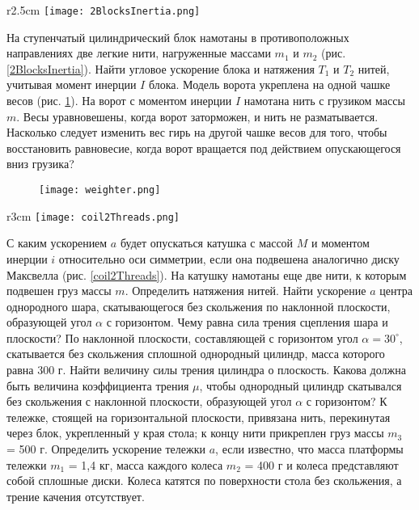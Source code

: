 \begin{wrapfigure}[13]{r}{2.5cm}
\texttt{[image: 2BlocksInertia.png]}
\caption{}
\label{2BlocksInertia}
\end{wrapfigure}
\AddProb На ступенчатый цилиндрический блок намотаны в противоположных направлениях две легкие нити, нагруженные массами $m_1$ и $m_2$ (рис. \ref{2BlocksInertia}). Найти угловое ускорение блока и натяжения $T_1$ и $T_2$ нитей, учитывая момент инерции $I$ блока.
\AddProb Модель ворота укреплена на одной чашке весов (рис. \ref{weighter}). На ворот с моментом инерции $I$ намотана нить с грузиком массы $m$. Весы уравновешены, когда ворот заторможен, и нить не разматывается. Насколько следует изменить вес гирь на другой чашке весов для того, чтобы восстановить равновесие, когда ворот вращается под действием опускающегося вниз грузика?

\begin{figure}[h]
\centering
\texttt{[image: weighter.png]}
\caption{}
\label{weighter}
\end{figure}
\begin{wrapfigure}[9]{r}{3cm}
\texttt{[image: coil2Threads.png]}
\caption{}
\label{coil2Threads}
\end{wrapfigure}
\AddProb С каким ускорением $a$ будет опускаться катушка с массой $M$ и моментом инерции $i$ относительно оси симметрии, если она подвешена аналогично диску Максвелла (рис. \ref{coil2Threads}). На катушку намотаны еще две нити, к которым подвешен груз массы $m$. Определить натяжения нитей.
\AddProb Найти ускорение $a$ центра однородного шара, скатывающегося без скольжения по наклонной плоскости, образующей угол $\alpha$ с горизонтом. Чему равна сила трения сцепления шара и плоскости?
\AddProb По наклонной плоскости, составляющей с горизонтом угол $\alpha = 30^{\circ}$, скатывается без скольжения сплошной однородный цилиндр, масса которого равна 300 г. Найти величину силы трения цилиндра о плоскость.
\AddProb Какова должна быть величина коэффициента трения $\mu$, чтобы однородный цилиндр скатывался без скольжения с наклонной 
плоскости, образующей угол $\alpha$ с горизонтом?
\AddProb К тележке, стоящей на горизонтальной плоскости, привязана
нить, перекинутая через блок, укрепленный у края стола; к концу нити прикреплен груз массы $m_3$ = 500 г. Определить ускорение тележки $a$, если известно, что масса платформы тележки $m_1$ = 1,4 кг, масса каждого колеса $m_2$ = 400 г и колеса представляют собой сплошные диски. Колеса катятся по поверхности стола без скольжения, а трение качения отсутствует.
\clearpage
